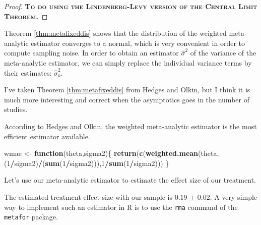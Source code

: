 \documentclass[]{book}
\newenvironment{Shaded}{\begin{snugshade}}{\end{snugshade}}
\newcommand{\ControlFlowTok}[1]{\textcolor[rgb]{0.13,0.29,0.53}{\textbf{#1}}}
\newcommand{\DataTypeTok}[1]{\textcolor[rgb]{0.13,0.29,0.53}{#1}}
\newcommand{\DecValTok}[1]{\textcolor[rgb]{0.00,0.00,0.81}{#1}}
\newcommand{\KeywordTok}[1]{\textcolor[rgb]{0.13,0.29,0.53}{\textbf{#1}}}
\newcommand{\NormalTok}[1]{#1}
\newcommand{\OperatorTok}[1]{\textcolor[rgb]{0.81,0.36,0.00}{\textbf{#1}}}
\newcommand{\StringTok}[1]{\textcolor[rgb]{0.31,0.60,0.02}{#1}}
\theoremstyle{definition}
\theoremstyle{definition}
\theoremstyle{definition}
\theoremstyle{remark}
\let\BeginKnitrBlock\begin \let\EndKnitrBlock\end
\begin{document}
\BeginKnitrBlock{proof}
\iffalse{} {Proof. } \fi{}\textbf{\textsc{To do using the Lindenberg-Levy version of the Central Limit Theorem.}}
\EndKnitrBlock{proof}

Theorem \ref{thm:metafixeddis} shows that the distribution of the weighted meta-analytic estimator converges to a normal, which is very convenient in order to compute sampling noise.
In order to obtain an estimator \(\hat{\sigma}^2\) of the variance of the meta-analytic estimator, we can simply replace the individual variance terms by their estimates: \(\hat{\sigma}_k^2\).

\BeginKnitrBlock{remark}
\iffalse{} {Remark. } \fi{}I've taken Theorem \ref{thm:metafixeddis} from Hedges and Olkin, but I think it is much more interesting and correct when the asymptotics goes in the number of studies.
\EndKnitrBlock{remark}

\BeginKnitrBlock{remark}
\iffalse{} {Remark. } \fi{}According to Hedges and Olkin, the weighted meta-analytic estimator is the most efficient estimator available.
\EndKnitrBlock{remark}

\begin{Shaded}
\begin{Highlighting}[]
\NormalTok{wmae <-}\StringTok{ }\ControlFlowTok{function}\NormalTok{(theta,sigma2)\{}
  \KeywordTok{return}\NormalTok{(}\KeywordTok{c}\NormalTok{(}\KeywordTok{weighted.mean}\NormalTok{(theta,(}\DecValTok{1}\OperatorTok{/}\NormalTok{sigma2)}\OperatorTok{/}\NormalTok{(}\KeywordTok{sum}\NormalTok{(}\DecValTok{1}\OperatorTok{/}\NormalTok{sigma2))),}\DecValTok{1}\OperatorTok{/}\KeywordTok{sum}\NormalTok{(}\DecValTok{1}\OperatorTok{/}\NormalTok{sigma2)))}
\NormalTok{\}}
\end{Highlighting}
\end{Shaded}

\BeginKnitrBlock{example}
\protect\hypertarget{exm:unnamed-chunk-149}{}{\label{exm:unnamed-chunk-149} }Let's use our meta-analytic estimator to estimate the effect size of our treatment.
\EndKnitrBlock{example}

The estimated treatment effect size with our sample is 0.19 \(\pm\) 0.02.
A very simple way to implement such an estimator in R is to use the \texttt{rma} command of the \texttt{metafor} package.

\begin{Shaded}
\end{Shaded}
\end{document}
